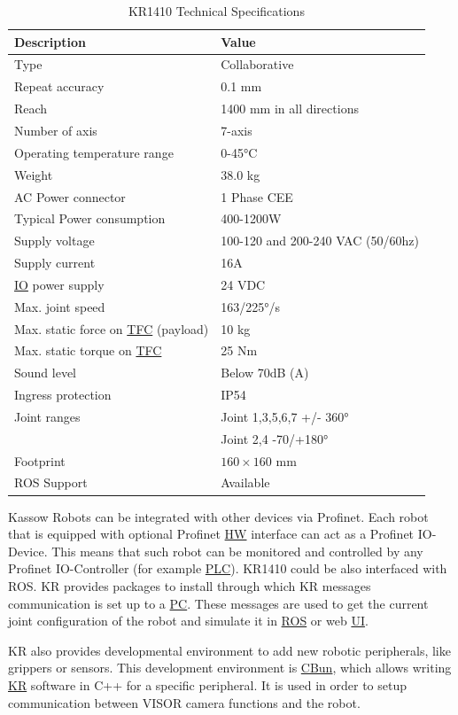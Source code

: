 \begin{table}[h!]
    \centering
    \small
    \renewcommand{\arraystretch}{1.2} %
    \begin{tabular}{ll}
        \textbf{Description} & \textbf{Value} \\ \hline
        Type & Collaborative \\
        Repeat accuracy & 0.1 mm \\
        Reach & 1400 mm in all directions\\
        Number of axis & 7-axis \\
        Operating temperature range & 0-45°C\\ 
        Weight & 38.0 kg \\ 
        AC Power connector & 1 Phase CEE \\ 
        Typical Power consumption & 400-1200W \\ 
        Supply voltage & 100-120 and 200-240 VAC (50/60hz) \\ 
        Supply current & 16A\\ 
        \hyperref[acro:IO]{IO} power supply & 24 VDC\\ 
        Max. joint speed  & 163/225°/s\\ 
        Max. static force on \hyperref[acro:TFC]{TFC} (payload) & 10 kg\\ 
        Max. static torque on \hyperref[acro:TFC]{TFC} & 25 Nm\\ 
        Sound level & Below 70dB (A) \\ 
        Ingress protection & IP54 \\ 
        Joint ranges & Joint 1,3,5,6,7 +/- 360° \\
        & Joint 2,4 -70/+180° \\ 
        Footprint& $160 \times 160$ mm \\ 
        ROS Support & Available \\ \hline
    \end{tabular}
    \caption{KR1410 Technical Specifications}
\end{table}


Kassow Robots can be integrated with other devices via Profinet. Each robot that is equipped with optional Profinet 
\hyperref[acro:HW]{HW} interface can act as a Profinet IO-Device.
This means that such robot can be monitored and controlled by any Profinet IO-Controller (for example \hyperref[acro:PLC]{PLC}). \cite{profinet}
KR1410 could be also interfaced with ROS. KR provides packages to install through which KR messages communication is set up to a \hyperref[acro:PC]{PC}.
These messages are used to get the current joint configuration of the robot and simulate it in \hyperref[acro:ROS]{ROS} or web \hyperref[acro:UI]{UI}. \cite{kassow-ros}

KR also provides developmental environment to add new robotic peripherals, like grippers or sensors. This development environment is \hyperref[acro:CBun]{CBun},
which allows writing \hyperref[acro:KR]{KR} software in C++ for a specific peripheral. It is used in order to setup communication between VISOR camera functions and the robot. \cite{Cbun}
